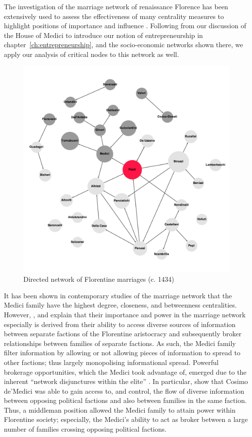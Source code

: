 The investigation of the marriage network of renaissance Florence has been extensively used to assess the effectiveness of many centrality measures to highlight positions of importance and influence \citep{Newman2003betweenness}. Following from our discussion of the House of Medici to introduce our notion of entrepreneurship in chapter~\ref{ch:entrepreneurship}, and the socio-economic networks shown there, we apply our analysis of critical nodes to this network as well.

\begin{figure}[t]
\centering
\includegraphics[scale=0.37]{Images/Florentine-marr.png}
\caption{Directed network of Florentine marriages (c. 1434)}
\label{Fig:FlorentineFamilies}
\end{figure}

It has been shown in contemporary studies of the marriage network that the Medici family have the highest degree, closeness, and betweenness centralities. However, \citet{Roover1963}, \citet{Padgett1994} and \citet{Goldthwaite2009} explain that their importance and power in the marriage network especially is derived from their ability to access diverse sources of information between separate factions of the Florentine aristocracy and subsequently broker relationships between families of separate factions. As such, the Medici family filter information by allowing or not allowing pieces of information to spread to other factions; thus largely monopolising informational spread. Powerful brokerage opportunities, which the Medici took advantage of, emerged due to the inherent ``network disjunctures within the elite'' \citep[p.~1259]{Padgett1993}. In particular, \citet{Padgett1993} show that Cosimo de'Medici was able to gain access to, and control, the flow of diverse information between opposing political factions and also between families in the same faction. Thus, a middleman position allowed the Medici family to attain power within Florentine society; especially, the Medici's ability to act as broker between a large number of families crossing opposing political factions.

